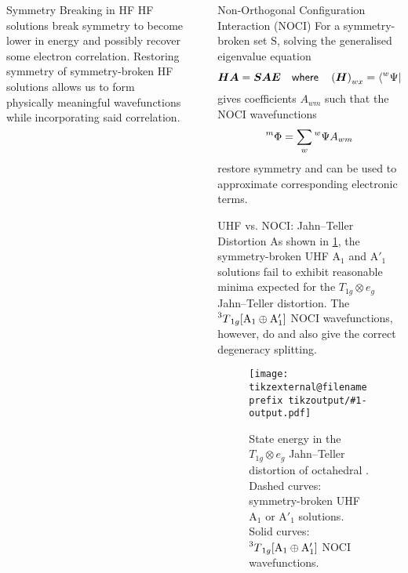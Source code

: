 \documentclass[final, xcolor={svgnames}]{beamer}
\makeatletter
\newif\iftikzex
\newcommand*{\useexternalfile}[1]{%
		\iftikzex
			\tikzsetnextfilename{tikzoutput/#1-output}%
			\scalebox{1}{}
		\else
			\texttt{[image: \\tikzexternal@filenameprefix tikzoutput/\#1-output.pdf]}
		\fi
	}
\newlength{\sepwidth}
\newlength{\colwidth}
\newcommand{\separatorcolumn}{\begin{column}{\sepwidth}\end{column}}
\makeatother
\begin{document}
\begin{frame}[t]
\begin{columns}[t]
\begin{column}{\colwidth}
\begin{alertblock}{Symmetry Breaking in HF}
			HF solutions break symmetry to become lower in energy and possibly recover some electron correlation. Restoring symmetry of symmetry-broken HF solutions allows us to form physically meaningful wavefunctions while incorporating said correlation.
		\end{alertblock}
	
	\end{column}
	
	\separatorcolumn
	
	\begin{column}{\colwidth}
	
		\begin{block}{Non-Orthogonal Configuration Interaction (NOCI)}
			For a symmetry-broken set $\mathrm{S}$, solving the generalised eigenvalue equation
				\begin{equation*}
					\boldsymbol{HA} = \boldsymbol{SAE} \quad %
					\textsf{where} \quad %
					\left(\boldsymbol{H}\right)_{wx} =
					\braket{\prescript{w}{}{\Psi}|\hat{\mathscr{H}}|\prescript{x}{}{\Psi}} \  %
					\textsf{and} \  %
					\left(\boldsymbol{S}\right)_{wx} = \braket{\prescript{w}{}{\Psi}|\prescript{x}{}{\Psi}} %
				\end{equation*}
			gives coefficients $A_{wm}$ such that the NOCI wavefunctions
				\begin{equation*}
					\prescript{m}{}{\Phi} = \sum_{w} \prescript{w}{}{\Psi} A_{wm}
				\end{equation*}
			restore symmetry and can be used to approximate corresponding electronic terms.
		\end{block}
	
		\begin{block}{UHF vs. NOCI: Jahn--Teller Distortion}
			As shown in \cref{fig:JT}, the symmetry-broken UHF $\mathrm{A}_1$ and $\mathrm{A}'_1$ solutions fail to exhibit reasonable minima expected for the $T_{1g} \otimes e_g$ Jahn--Teller distortion.
			The $\prescript{3}{}{T}_{1g}[\mathrm{A}_1 \oplus \mathrm{A}'_1]$ NOCI wavefunctions, however, do and also give the correct degeneracy splitting.
			
			
			
			\begin{figure}
				\centering
				\useexternalfile{A.JT.Eg.minimal}
				\captionsetup{justification=centering}
				\caption{
					State energy in the $T_{1g} \otimes e_g$ Jahn--Teller distortion of octahedral \ce{[VF6]^{3-}}.\\[6pt]
					\footnotesize Dashed curves: symmetry-broken UHF $\mathrm{A}_1$ or $\mathrm{A}'_1$ solutions. Solid curves: $\prescript{3}{}{T}_{1g}[\mathrm{A}_1 \oplus \mathrm{A}'_1]$ NOCI wavefunctions.}
				\label{fig:JT}
			\end{figure}
		\end{block}
		

\end{column}
\end{columns}
\end{frame}
\end{document}
